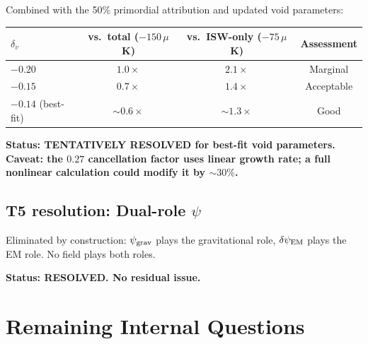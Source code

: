 \documentclass[11pt]{article}
\newcommand{\psigrav}{\psi_{\rm grav}}
\newcommand{\dpsiEM}{\delta\psi_{\rm EM}}
\begin{document}
Combined with the 50\% primordial attribution and updated void
parameters:
\begin{center}
\begin{tabular}{lccc}
\toprule
$\delta_v$ & vs.\ total ($-150\,\mu$K) & vs.\ ISW-only ($-75\,\mu$K)
& Assessment \\
\midrule
$-0.20$ & $1.0\times$ & $2.1\times$ & Marginal \\
$-0.15$ & $0.7\times$ & $1.4\times$ & Acceptable \\
$-0.14$ (best-fit) & $\sim 0.6\times$ & $\sim 1.3\times$ & Good \\
\bottomrule
\end{tabular}
\end{center}

\textbf{Status: TENTATIVELY RESOLVED for best-fit void parameters.
Caveat: the $0.27$ cancellation factor uses linear growth rate; a full
nonlinear calculation could modify it by $\sim 30\%$.}

\subsection{T5 resolution: Dual-role $\psi$}

Eliminated by construction: $\psigrav$ plays the gravitational role,
$\dpsiEM$ plays the EM role. No field plays both roles.

\textbf{Status: RESOLVED. No residual issue.}


\section{Remaining Internal Questions}
\label{sec:remaining}
\end{document}
